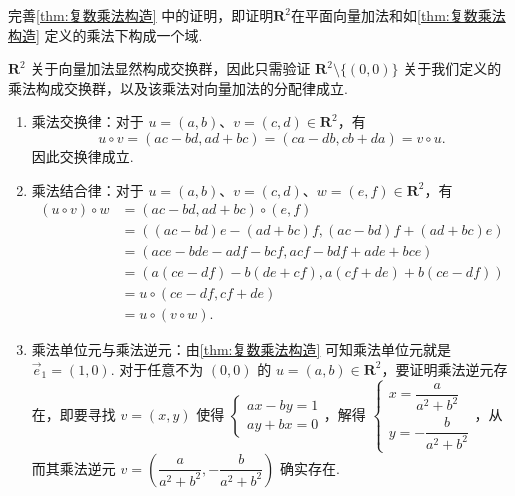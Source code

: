 \begin{exercise}

    \begin{exgroup}
        \item 完善\autoref{thm:复数乘法构造} 中的证明，即证明$\mathbf{R}^2$在平面向量加法和如\autoref*{thm:复数乘法构造} 定义的乘法下构成一个域.

        \begin{answer}
            $\mathbf{R}^2$ 关于向量加法显然构成交换群，因此只需验证 $\mathbf{R}^2 \setminus \{(0,0)\} $ 关于我们定义的乘法构成交换群，以及该乘法对向量加法的分配律成立.

            \begin{enumerate}
                \item 乘法交换律：对于 $u=(a,b)$、$v=(c,d) \in \mathbf{R}^2$，有
                      \[
                          u \circ v = (ac - bd, ad + bc) = (ca - db, cb + da) = v \circ u.
                      \] 因此交换律成立.
                \item 乘法结合律：对于 $u=(a,b)$、$v=(c,d)$、$w=(e,f) \in \mathbf{R}^2$，有
                      \begin{align*}
                          (u \circ v) \circ w & = (ac - bd, ad + bc) \circ (e,f)                         \\
                                              & = ((ac - bd)e - (ad + bc)f, (ac - bd)f + (ad + bc)e)     \\
                                              & = (ace - bde - adf - bcf, acf - bdf + ade + bce)         \\
                                              & = (a(ce - df) - b(de + cf), a(cf + de) + b(ce - df))     \\
                                              & = u \circ (ce - df, cf + de)                             \\
                                              & = u \circ (v \circ w).
                      \end{align*}
                \item 乘法单位元与乘法逆元：由\autoref{thm:复数乘法构造} 可知乘法单位元就是 $\vec{e}_1 = (1,0)$. 对于任意不为 $(0,0)$ 的 $u=(a,b) \in \mathbf{R}^2$，要证明乘法逆元存在，即要寻找 $v = (x, y)$ 使得 $\begin{cases}
                            ax - by = 1 \\
                            ay + bx = 0
                        \end{cases}$，解得 $\begin{cases}
                            x = \dfrac{a}{a^2 + b^2} \\
                            y = -\dfrac{b}{a^2 + b^2}
                \end{cases}$，从而其乘法逆元 $v = \left( \dfrac{a}{a^2+b^2}, -\dfrac{b}{a^2+b^2} \right)$ 确实存在.


\end{enumerate}
\end{answer}
\end{exgroup}
\end{exercise}

